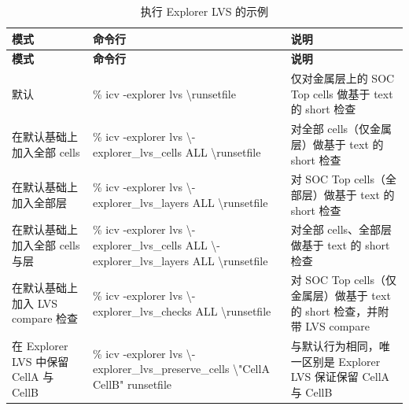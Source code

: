 \begin{longtable}{@{}p{} >{\raggedright\arraybackslash\ttfamily}p{} p{}@{}}
\caption{执行 Explorer LVS 的示例}\label{tab:explorer-lvs-examples}\\
\toprule
\textbf{\textrm{模式}} & \textbf{\textrm{命令行}} & \textbf{\textrm{说明}} \\
\midrule
\endfirsthead
\toprule
\textbf{\textrm{模式}} & \textbf{\textrm{命令行}} & \textbf{\textrm{说明}} \\
\midrule
\endhead
\bottomrule
\endfoot
默认
  & \% icv -explorer lvs \textbackslash\newline runsetfile
  & 仅对金属层上的 SOC Top cells 做基于 text 的 short 检查 \\
在默认基础上加入全部 cells
  & \% icv -explorer lvs \textbackslash\newline -explorer\_lvs\_cells ALL \textbackslash\newline runsetfile
  & 对全部 cells（仅金属层）做基于 text 的 short 检查 \\
在默认基础上加入全部层
  & \% icv -explorer lvs \textbackslash\newline -explorer\_lvs\_layers ALL \textbackslash\newline runsetfile
  & 对 SOC Top cells（全部层）做基于 text 的 short 检查 \\
在默认基础上加入全部 cells 与层
  & \% icv -explorer lvs \textbackslash\newline -explorer\_lvs\_cells ALL \textbackslash\newline -explorer\_lvs\_layers ALL \textbackslash\newline runsetfile
  & 对全部 cells、全部层做基于 text 的 short 检查 \\
在默认基础上加入 LVS compare 检查
  & \% icv -explorer lvs \textbackslash\newline -explorer\_lvs\_checks ALL \textbackslash\newline runsetfile
  & 对 SOC Top cells（仅金属层）做基于 text 的 short 检查，并附带 LVS compare \\
在 Explorer LVS 中保留 CellA 与 CellB
  & \% icv -explorer lvs \textbackslash\newline -explorer\_lvs\_preserve\_cells \textbackslash\newline "CellA CellB" runsetfile
  & 与默认行为相同，唯一区别是 Explorer LVS 保证保留 CellA 与 CellB \\
\end{longtable}

